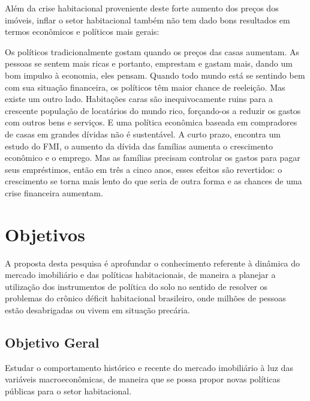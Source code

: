\documentclass[
	12pt,				%
	oneside,			%
	a4paper,			%
	chapter=TITLE,		%
	section=TITLE,		%
	english,			%
	brazil				%
	]{abntex2}
\begin{document}
\begin{refsection}
Além da crise habitacional proveniente deste forte aumento dos preços dos
imóveis, inflar o setor habitacional também não tem dado bons resultados em
termos econômicos e políticos mais gerais:
\begin{citacao}
Os políticos tradicionalmente gostam quando os preços das casas aumentam. As
pessoas se sentem mais ricas e portanto, emprestam e gastam mais, dando um bom
impulso à economia, eles pensam. Quando todo mundo está se sentindo bem com sua
situação financeira, os políticos têm maior chance de reeleição. Mas existe um
outro lado. Habitações caras são inequivocamente ruins para a crescente
população de locatários do mundo rico, forçando-os a reduzir os gastos com
outros bens e serviços. E uma política econômica baseada em compradores de casas
em grandes dívidas não é sustentável. A curto prazo, encontra um estudo do FMI,
o aumento da dívida das famílias aumenta o crescimento econômico e o emprego.
Mas as famílias precisam controlar os gastos para pagar seus empréstimos, então
em três a cinco anos, esses efeitos são revertidos: o crescimento se torna mais
lento do que seria de outra forma e as chances de uma crise financeira aumentam.
\cite{economist-housing-2020}
\end{citacao}
\hypertarget{objetivos}{%
\section{Objetivos}\label{objetivos}}

A proposta desta pesquisa é aprofundar o conhecimento referente à dinâmica do
mercado imobiliário e das políticas habitacionais, de maneira a planejar a
utilização dos instrumentos de política do solo no sentido de resolver os
problemas do crônico déficit habitacional brasileiro, onde milhões de pessoas
estão desabrigadas ou vivem em situação precária.

\hypertarget{objetivo-geral}{%
\subsection{Objetivo Geral}\label{objetivo-geral}}

Estudar o comportamento histórico e recente do mercado imobiliário à luz das
variáveis macroeconômicas, de maneira que se possa propor novas políticas
públicas para o setor habitacional.

\hypertarget{objetivos-especuxedficos}{%
}
\end{refsection}
\end{document}
